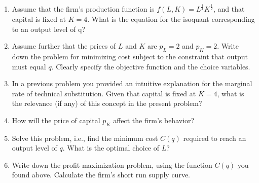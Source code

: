 \begin{enumerate}
    \begin{enumerate}

    \item Assume that the firm's production function is $f(L, K)=L^{\frac{1}{4}}K^{\frac{1}{2}}$, and that capital is fixed at $K=4$. What is the equation for the isoquant corresponding to an output level of q?


    \item Assume further that the prices of $L$ and $K$ are $p_L=2$ and $p_K=2$. Write down the problem for minimizing cost subject to the constraint that output must equal $q$. Clearly specify the objective function and the choice variables.


    \item In a previous problem you provided an intuitive explanation for the marginal rate of technical substitution. Given that capital is fixed at $K=4$, what is the relevance (if any) of this concept in the present problem?


    \item How will the price of capital $p_K$ affect the firm's behavior?


    \item Solve this problem, i.e., find the minimum cost $C(q)$ required to reach an output level of $q$. What is the optimal choice of $L$?


    \item Write down the profit maximization problem, using the function $C(q)$ you found above. Calculate the firm's short run supply curve.


\end{enumerate}
\end{enumerate}
